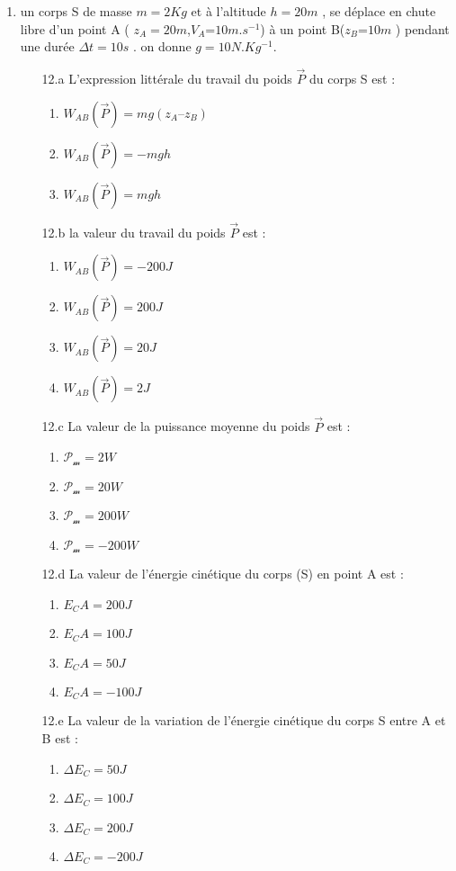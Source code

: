 \documentclass[12pt]{article}
\begin{document}
\begin{multicols}{2}
\begin{enumerate}


\item un corps S de masse $m = 2Kg$ et à l’altitude $h = 20 m$ , se déplace en chute libre d’un point A ( $z_A = 20 m$,$V_A$=$10 m.s^{-1}$) à un point B($z_B$=$10 m$ ) pendant une durée $\Delta{t} =  10 s$ . on donne $g =10N.Kg^{-1}$.
 \begin{enumerate}
	 \item[12.a] 	 L’expression littérale du travail du poids $\vec{P}$ du corps S est : 
		 \begin{enumerate}
			 \item  $W_{AB}(\vec{P}) = mg ( z_A – z_B )$		
			 \item  $W_{AB}(\vec{P}) = -mgh$
			 \item  $W_{AB}(\vec{P}) = mgh$

		 \end{enumerate}

	 \item[12.b] la valeur du travail du poids $\vec{P}$ est :
		 \begin{enumerate}
			 \item  $W_{AB}(\vec{P}) = -200J$		
			 \item  $W_{AB}(\vec{P}) = 200J$
			 \item  $W_{AB}(\vec{P}) = 20J$
			 \item  $W_{AB}(\vec{P}) = 2J$

		 \end{enumerate}

		 \vspace{5cm}
	 \item[12.c] La valeur de la puissance moyenne du poids $\vec{P}$ est :  
 \begin{enumerate}
	 \item $\mathscr{P_m} = 2W$
	 \item $\mathscr{P_m} = 20W$
	 \item $\mathscr{P_m} = 200W$
	 \item $\mathscr{P_m} = -200W$
  \end{enumerate}
\item[12.d] La valeur de l’énergie cinétique du corps (S) en point A est : 
	\begin{enumerate}
	 \item $E_CA = 200J$
	 \item $E_CA = 100J$
	 \item $E_CA = 50J$
	 \item $E_CA = -100J$
	   \end{enumerate}
   \item[12.e] La valeur de la variation de l’énergie cinétique du corps S entre A et B est :
\begin{enumerate}
	\item $\Delta{E_C} = 50J$
	\item $\Delta{E_C} = 100J$
	\item $\Delta{E_C} = 200J$
	\item $\Delta{E_C} = -200J$
	   \end{enumerate}



\end{enumerate}
\end{enumerate}
\end{multicols}
\end{document}
